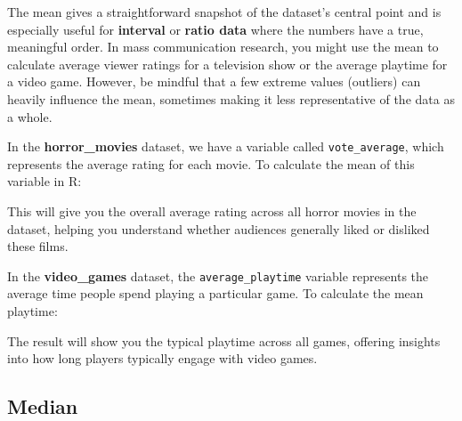 \documentclass[
]{book}
\newenvironment{Shaded}{\begin{snugshade}}{\end{snugshade}}
\newcommand{\AttributeTok}[1]{\textcolor[rgb]{0.13,0.29,0.53}{#1}}
\newcommand{\CommentTok}[1]{\textcolor[rgb]{0.56,0.35,0.01}{\textit{#1}}}
\newcommand{\ConstantTok}[1]{\textcolor[rgb]{0.56,0.35,0.01}{#1}}
\newcommand{\FunctionTok}[1]{\textcolor[rgb]{0.13,0.29,0.53}{\textbf{#1}}}
\newcommand{\NormalTok}[1]{#1}
\newcommand{\OtherTok}[1]{\textcolor[rgb]{0.56,0.35,0.01}{#1}}
\newcommand{\SpecialCharTok}[1]{\textcolor[rgb]{0.81,0.36,0.00}{\textbf{#1}}}
\begin{document}
The mean gives a straightforward snapshot of the dataset's central point and is especially useful for \textbf{interval} or \textbf{ratio data} where the numbers have a true, meaningful order. In mass communication research, you might use the mean to calculate average viewer ratings for a television show or the average playtime for a video game. However, be mindful that a few extreme values (outliers) can heavily influence the mean, sometimes making it less representative of the data as a whole.

In the \textbf{horror\_movies} dataset, we have a variable called \texttt{vote\_average}, which represents the average rating for each movie. To calculate the mean of this variable in R:

\begin{Shaded}
\end{Shaded}

This will give you the overall average rating across all horror movies in the dataset, helping you understand whether audiences generally liked or disliked these films.

In the \textbf{video\_games} dataset, the \texttt{average\_playtime} variable represents the average time people spend playing a particular game. To calculate the mean playtime:

\begin{Shaded}
\end{Shaded}

The result will show you the typical playtime across all games, offering insights into how long players typically engage with video games.

\subsection*{Median}\label{median}
\end{document}
